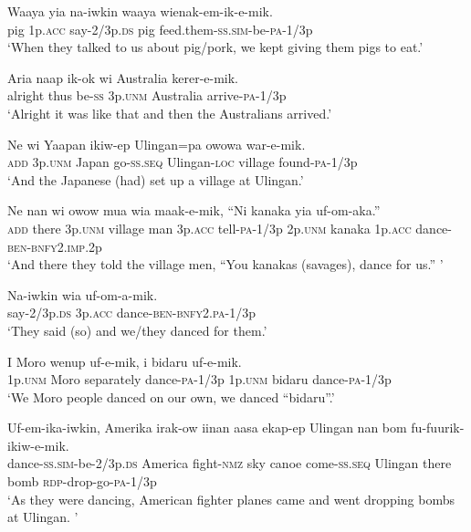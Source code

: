 \ea
\gll  Waaya  yia  na-iwkin  waaya  wienak-em-ik-e-mik. \\
pig  1p.\textsc{acc}  say-2/3p.\textsc{ds}  pig  feed.them{}-\textsc{ss}.\textsc{sim}-be-\textsc{pa}-1/3p \\
\glt ‘When they talked to us about pig/pork, we kept giving them pigs to eat.’ \\
\z


\ea
\gll  Aria  naap  ik-ok  wi  Australia  kerer-e-mik. \\
alright  thus  be-\textsc{ss}  3p.\textsc{unm}  Australia  arrive-\textsc{pa}-1/3p \\
\glt ‘Alright it was like that and then the Australians arrived.’ \\
\z


\ea
\gll  Ne  wi  Yaapan  ikiw-ep  Ulingan=pa  owowa war-e-mik. \\
\textsc{add}  3p.\textsc{unm}  Japan  go-\textsc{ss.seq}  Ulingan-\textsc{loc}  village found-\textsc{pa}-1/3p \\ 
\glt ‘And the Japanese (had) set up a village at Ulingan.’ \\
\z


\ea
\gll  Ne  nan  wi  owow  mua  wia  maak-e-mik, “Ni  kanaka  yia  uf-om-aka.” \\
\textsc{add}  there  3p.\textsc{unm}  village  man  3p.\textsc{acc}  tell-\textsc{pa}-1/3p  2p.\textsc{unm}  kanaka  1p.\textsc{acc}  dance-\textsc{ben}-\textsc{bnfy}2.\textsc{imp}.2p \\ 
\glt ‘And there they told the village men, “You kanakas (savages), dance for us.” ’ \\
\z


\ea
\gll  Na-iwkin  wia  uf-om-a-mik. \\
say-2/3p.\textsc{ds}  3p.\textsc{acc}  dance-\textsc{ben}-\textsc{bnfy}2.\textsc{pa}-1/3p \\
\glt ‘They said (so) and we/they danced for them.’ \\
\z


\ea
\gll  I  Moro  wenup  uf-e-mik, i  bidaru  uf-e-mik. \\
1p.\textsc{unm}  Moro  separately  dance-\textsc{pa}-1/3p 1p.\textsc{unm}  bidaru  dance-\textsc{pa}-1/3p \\ 
\glt ‘We Moro people danced on our own, we danced “bidaru”.’ \\
\z


\ea
\gll  Uf-em-ika-iwkin,  Amerika  irak-ow  iinan  aasa  ekap-ep  Ulingan  nan  bom  fu-fuurik-ikiw-e-mik. \\
dance-\textsc{ss}.\textsc{sim}-be-2/3p.\textsc{ds}  America  fight-\textsc{nmz}  sky  canoe come-\textsc{ss.seq}  Ulingan  there  bomb  \textsc{rdp}-drop-go-\textsc{pa}-1/3p \\ 
\glt ‘As they were dancing, American fighter planes came and went dropping bombs at Ulingan. ’ \\
\z


